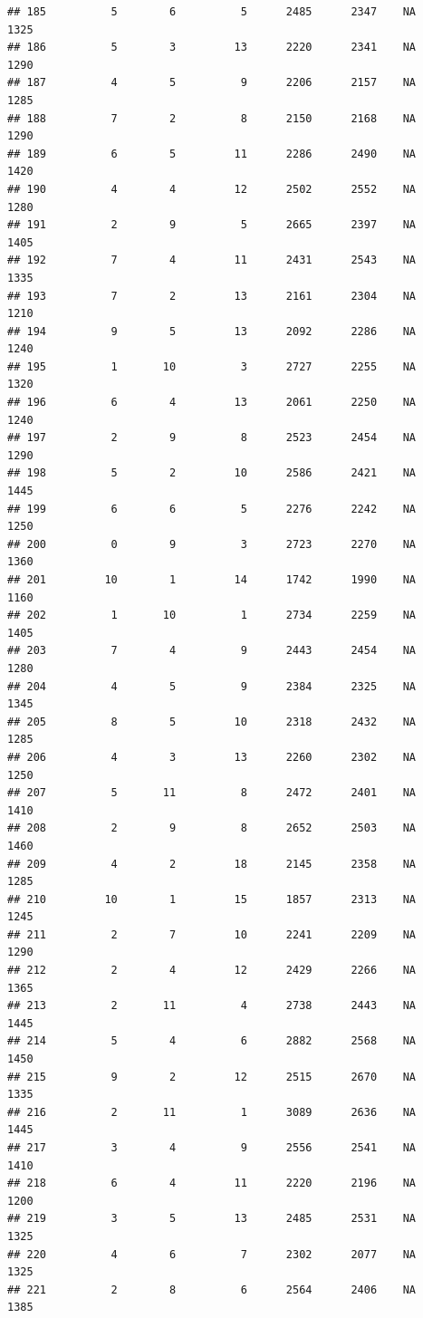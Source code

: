 \documentclass[]{book}
\begin{document}
\begin{verbatim}
## 185          5        6          5      2485      2347    NA    1325
## 186          5        3         13      2220      2341    NA    1290
## 187          4        5          9      2206      2157    NA    1285
## 188          7        2          8      2150      2168    NA    1290
## 189          6        5         11      2286      2490    NA    1420
## 190          4        4         12      2502      2552    NA    1280
## 191          2        9          5      2665      2397    NA    1405
## 192          7        4         11      2431      2543    NA    1335
## 193          7        2         13      2161      2304    NA    1210
## 194          9        5         13      2092      2286    NA    1240
## 195          1       10          3      2727      2255    NA    1320
## 196          6        4         13      2061      2250    NA    1240
## 197          2        9          8      2523      2454    NA    1290
## 198          5        2         10      2586      2421    NA    1445
## 199          6        6          5      2276      2242    NA    1250
## 200          0        9          3      2723      2270    NA    1360
## 201         10        1         14      1742      1990    NA    1160
## 202          1       10          1      2734      2259    NA    1405
## 203          7        4          9      2443      2454    NA    1280
## 204          4        5          9      2384      2325    NA    1345
## 205          8        5         10      2318      2432    NA    1285
## 206          4        3         13      2260      2302    NA    1250
## 207          5       11          8      2472      2401    NA    1410
## 208          2        9          8      2652      2503    NA    1460
## 209          4        2         18      2145      2358    NA    1285
## 210         10        1         15      1857      2313    NA    1245
## 211          2        7         10      2241      2209    NA    1290
## 212          2        4         12      2429      2266    NA    1365
## 213          2       11          4      2738      2443    NA    1445
## 214          5        4          6      2882      2568    NA    1450
## 215          9        2         12      2515      2670    NA    1335
## 216          2       11          1      3089      2636    NA    1445
## 217          3        4          9      2556      2541    NA    1410
## 218          6        4         11      2220      2196    NA    1200
## 219          3        5         13      2485      2531    NA    1325
## 220          4        6          7      2302      2077    NA    1325
## 221          2        8          6      2564      2406    NA    1385

\end{verbatim}
\end{document}
